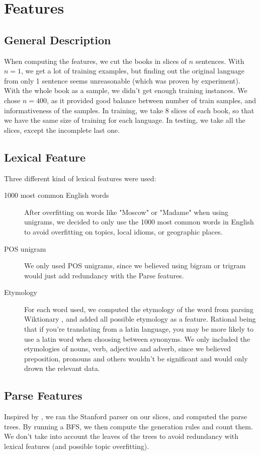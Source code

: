\documentclass[10pt]{article}
\begin{document}
\section{Features}
\subsection{General Description}
When computing the features, we cut the books in slices of $n$ sentences. With $n=1$, we get a lot of training examples, but finding out the original language from only 1 sentence seems unreasonable (which was proven by experiment). With the whole book as a sample, we didn't get enough training instances. We chose $n=400$, as it provided good balance between number of train samples, and informativeness of the samples. In training, we take 8 slices of each book, so that we have the same size of training for each language. In testing, we take all the slices, except the incomplete last one.
\subsection{Lexical Feature}
Three different kind of lexical features were used:
\begin{description}
\item[1000 most common English words] After overfitting on words like "Moscow" or "Madame" when using unigrams, we decided to only use the 1000 most common words in English to avoid overfitting on topics, local idioms, or geographic places.
\item[POS unigram] We only used POS unigrams, since we believed using bigram or trigram would just add redundancy with the Parse features.
\item[Etymology] For each word used, we computed the etymology of the word from parsing Wiktionary \cite{Wiktionary}, and added all possible etymology as a feature. Rational being that if you're translating from a latin language, you may be more likely to use a latin word when choosing between synonyms. We only included the etymologies of nouns, verb, adjective and adverb, since we believed preposition, pronouns  and others wouldn't be significant and would only drown the relevant data.
\end{description}

\subsection{Parse Features}
Inspired by \cite{Parse}, we ran the Stanford parser on our slices, and computed the parse trees. By running a BFS, we then compute the generation rules and count them. We don't take into account the leaves of the trees to avoid redundancy with lexical features (and possible topic overfitting).
\end{document}
